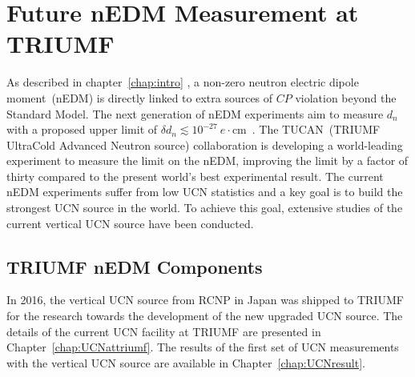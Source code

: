 \chapter{Future nEDM Measurement at TRIUMF\label{chap:nedm}}

As described in chapter~\ref{chap:intro} , a non-zero neutron electric
dipole moment~(nEDM) is directly linked to extra sources of $CP$
violation beyond the Standard Model. The next generation of nEDM
experiments aim to measure $d_n$ with a proposed upper limit of
$\delta d_n\lesssim
10^{-27}~e\cdot$cm~\cite{serebrov2014new,serebrov2011supersource,Kirch_talk,baker2011search,altarev2012next,golub1994neutron,ito2007plans,picker2017minuscule}.
The TUCAN~(TRIUMF UltraCold Advanced Neutron source) collaboration is
developing a world-leading experiment to measure the limit on the
nEDM, improving the limit by a factor of thirty compared to the
present world’s best experimental result. The current nEDM experiments
suffer from low UCN statistics and a key goal is to build the
strongest UCN source in the world. To achieve this goal, extensive
studies of the current vertical UCN source have been conducted.



\section{TRIUMF nEDM Components~\label{sec:triumfnedm}}
In 2016, the vertical UCN source from RCNP in Japan was shipped to
TRIUMF for the research towards the development of the new upgraded
UCN source.  The details of the current UCN facility at TRIUMF are
presented in Chapter~\ref{chap:UCNattriumf}. The results of the first
set of UCN measurements with the vertical UCN source are available in
Chapter~\ref{chap:UCNresult}.



